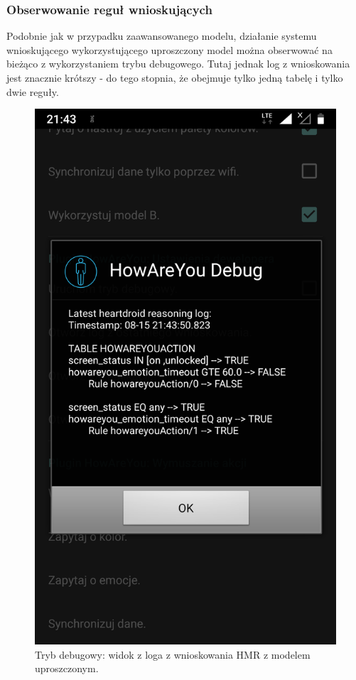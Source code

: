 \subsubsection{Obserwowanie reguł wnioskujących}

Podobnie jak w przypadku zaawansowanego modelu, działanie systemu wnioskującego wykorzystującego uproszczony model można obserwować na bieżąco z wykorzystaniem trybu debugowego. Tutaj jednak log z wnioskowania jest znacznie krótszy - do tego stopnia, że obejmuje tylko jedną tabelę i tylko dwie reguły.

\begin{figure}[H]
	\centering
	\includegraphics[scale=0.15]{rozdzial4/HMR_screenshots_B.png}
	\caption{Tryb debugowy: widok z loga z wnioskowania HMR z modelem uproszczonym.}
\end{figure}
